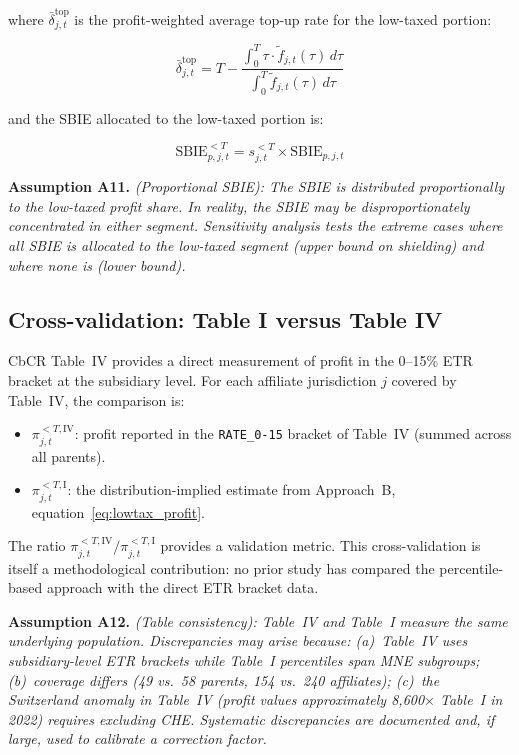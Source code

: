 \documentclass[11pt,a4paper]{article}
\newcommand{\code}[1]{\texttt{#1}}
\newcommand{\assumption}[2]{\noindent\textbf{Assumption #1.} \textit{#2}\medskip}
\begin{document}
where $\bar{\delta}_{j,t}^{\text{top}}$ is the profit-weighted average top-up rate for the low-taxed portion:

\begin{equation}\label{eq:avg_topup_rate}
\bar{\delta}_{j,t}^{\text{top}} = T - \frac{\int_0^{T} \tau \cdot \tilde{f}_{j,t}(\tau) \, d\tau}{\int_0^{T} \tilde{f}_{j,t}(\tau) \, d\tau}
\end{equation}

and the SBIE allocated to the low-taxed portion is:

\begin{equation}\label{eq:sbie_lowtax}
\text{SBIE}_{p,j,t}^{<T} = s_{j,t}^{<T} \times \text{SBIE}_{p,j,t}
\end{equation}

\assumption{A11}{(Proportional SBIE): The SBIE is distributed proportionally to the low-taxed profit share. In reality, the SBIE may be disproportionately concentrated in either segment. Sensitivity analysis tests the extreme cases where all SBIE is allocated to the low-taxed segment (upper bound on shielding) and where none is (lower bound).}


\subsection{Cross-validation: Table I versus Table IV}\label{sec:crossval}


CbCR Table~IV provides a direct measurement of profit in the 0--15\% ETR bracket at the subsidiary level. For each affiliate jurisdiction $j$ covered by Table~IV, the comparison is:

\begin{itemize}
\item $\pi_{j,t}^{<T,\text{IV}}$: profit reported in the \code{RATE\_0-15} bracket of Table~IV (summed across all parents).
\item $\pi_{j,t}^{<T,\text{I}}$: the distribution-implied estimate from Approach~B, equation~\eqref{eq:lowtax_profit}.
\end{itemize}

The ratio $\pi_{j,t}^{<T,\text{IV}} / \pi_{j,t}^{<T,\text{I}}$ provides a validation metric. This cross-validation is itself a methodological contribution: no prior study has compared the percentile-based approach with the direct ETR bracket data.

\assumption{A12}{(Table consistency): Table~IV and Table~I measure the same underlying population. Discrepancies may arise because: (a)~Table~IV uses subsidiary-level ETR brackets while Table~I percentiles span MNE subgroups; (b)~coverage differs (49 vs.\ 58 parents, 154 vs.\ 240 affiliates); (c)~the Switzerland anomaly in Table~IV (profit values approximately 8,600$\times$ Table~I in 2022) requires excluding CHE. Systematic discrepancies are documented and, if large, used to calibrate a correction factor.}
\end{document}
